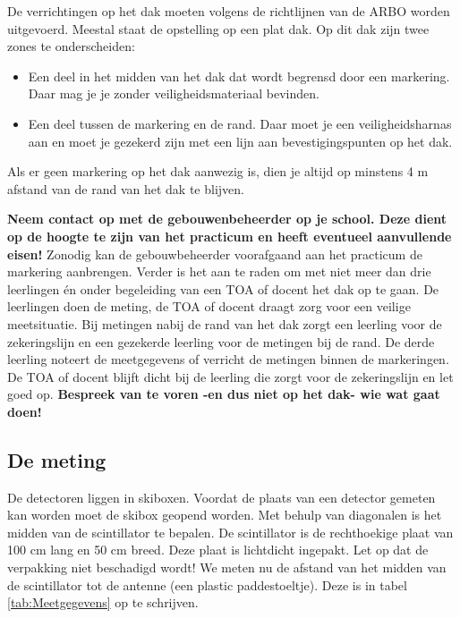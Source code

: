 De verrichtingen op het dak moeten volgens de richtlijnen van de ARBO worden uitgevoerd.
Meestal staat de opstelling op een plat dak. Op dit dak zijn twee zones
te onderscheiden:

\begin{itemize}
    \item Een deel in het midden van het dak dat wordt begrensd door een
          markering. Daar mag je je zonder
          veiligheidsmateriaal bevinden.
    \item Een deel tussen de markering en de rand. Daar moet je
          een veiligheidsharnas aan en moet je gezekerd zijn met een lijn aan
          bevestigingspunten op het dak.
\end{itemize}
Als er geen markering op het dak aanwezig is, dien je altijd op minstens 4 m afstand van de rand van het dak te blijven.

\textbf{Neem contact op met de gebouwenbeheerder op je school. Deze
dient op de hoogte te zijn van het practicum en heeft eventueel
aanvullende eisen!} Zonodig kan de gebouwbeheerder voorafgaand aan het practicum de markering aanbrengen. 
Verder is het aan te raden om met niet meer dan drie
leerlingen \'en onder begeleiding van een TOA of docent het dak op te gaan.
De leerlingen doen de meting, de TOA of docent draagt zorg voor een
veilige meetsituatie. Bij metingen nabij de rand van het dak zorgt een leerling voor
de zekeringslijn en een gezekerde leerling voor de metingen bij de rand. De derde leerling noteert de meetgegevens of verricht de metingen binnen de markeringen. De TOA of docent blijft dicht bij de leerling die zorgt
voor de zekeringslijn en let goed op. \textbf{Bespreek van te voren -en
dus niet op het dak- wie wat gaat doen!}


\subsection{De meting}

De detectoren liggen in skiboxen. Voordat de plaats van een detector
gemeten kan worden moet de skibox geopend worden. Met behulp van
diagonalen is het midden van de scintillator te bepalen. De scintillator
is de rechthoekige plaat van 100 cm lang en 50 cm breed. Deze plaat is
lichtdicht ingepakt. Let op dat de verpakking niet beschadigd wordt! We
meten nu de afstand van het midden van de scintillator tot de \gps
antenne (een plastic paddestoeltje). Deze is in tabel
\ref{tab:Meetgegevens} op te schrijven.

